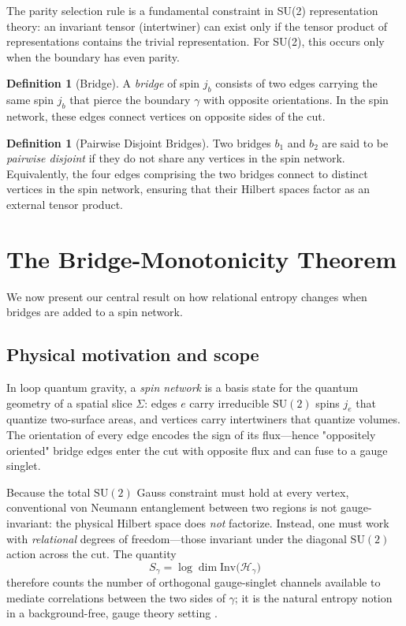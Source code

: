 \documentclass[11pt, a4paper]{article}
\theoremstyle{plain}
\theoremstyle{definition}
\newtheorem{definition}[theorem]{Definition}
\theoremstyle{remark}
\newcommand{\Hil}{\mathcal{H}}
\newcommand{\Inv}{\mathrm{Inv}}
\newcommand{\SU}{\mathrm{SU}}
\begin{document}
The parity selection rule is a fundamental constraint in SU(2) representation theory: an invariant tensor (intertwiner) can exist only if the tensor product of representations contains the trivial representation. For SU(2), this occurs only when the boundary has even parity.

\begin{definition}[Bridge]
\label{def:bridge}
A \emph{bridge} of spin $j_b$ consists of two edges carrying the same spin $j_b$ that pierce the boundary $\gamma$ with opposite orientations. In the spin network, these edges connect vertices on opposite sides of the cut.
\end{definition}

\begin{definition}[Pairwise Disjoint Bridges]
\label{def:disjoint_bridges}
Two bridges $b_1$ and $b_2$ are said to be \emph{pairwise disjoint} if they do not share any vertices in the spin network. Equivalently, the four edges comprising the two bridges connect to distinct vertices in the spin network, ensuring that their Hilbert spaces factor as an external tensor product.
\end{definition}

\section{The Bridge-Monotonicity Theorem}
\label{sec:bridge-monotonicity}

We now present our central result on how relational entropy changes when bridges are added to a spin network.

\subsection{Physical motivation and scope}
\label{sec:motivation}

In loop quantum gravity, a \emph{spin network} is a basis state for the quantum geometry of a spatial slice $\Sigma$: edges $e$ carry irreducible $\SU(2)$ spins $j_e$ that quantize two-surface areas, and vertices carry intertwiners that quantize volumes. The orientation of every edge encodes the sign of its flux—hence "oppositely oriented" bridge edges enter the cut with opposite flux and can fuse to a gauge singlet.

Because the total $\SU(2)$ Gauss constraint must hold at every vertex, conventional von Neumann entanglement between two regions is not gauge-invariant: the physical Hilbert space does \emph{not} factorize. Instead, one must work with \emph{relational} degrees of freedom—those invariant under the diagonal $\SU(2)$ action across the cut. The quantity
\[  S_{\gamma}=\log\dim\Inv\bigl(\Hil_{\gamma}\bigr)\]
therefore counts the number of orthogonal gauge-singlet channels available to mediate correlations between the two sides of $\gamma$; it is the natural entropy notion in a background-free, gauge theory setting \cite{DonnellyFreidel2016,DonnellyWall2016}.
\end{document}
